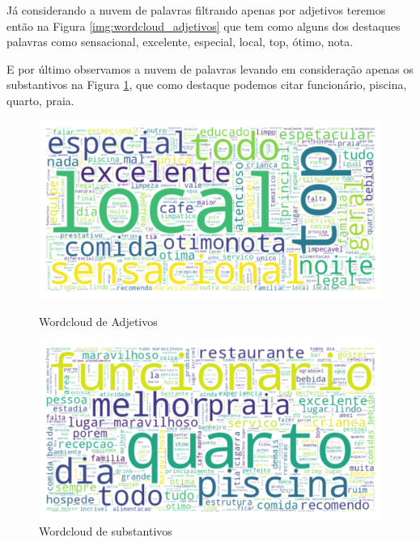 Já considerando a nuvem de palavras filtrando apenas por adjetivos teremos então na Figura \ref{img:wordcloud_adjetivos} que tem como alguns dos destaques palavras como sensacional, excelente, especial, local, top, ótimo, nota.

E por último observamos a nuvem de palavras levando em consideração apenas os substantivos na Figura \ref{img:wordcloud_substantivos}, que como destaque podemos citar funcionário, piscina, quarto, praia.

\begin{figure}
	\centering
	\begin{minipage}{0.45\textwidth}
		\centering
		\includegraphics[width=1\textwidth]{figs/exploratoria/wordcloud_adjetivos.png}
		\caption{Wordcloud de Adjetivos}
		\label{img:wordcloud_adjetivos}
	\end{minipage}
	\begin{minipage}{0.45\textwidth}
		\centering
		\includegraphics[width=1\textwidth]{figs/exploratoria/wordcloud_substantivos.png}
		\caption{Wordcloud de substantivos}
		\label{img:wordcloud_substantivos}
	\end{minipage}
\end{figure}

